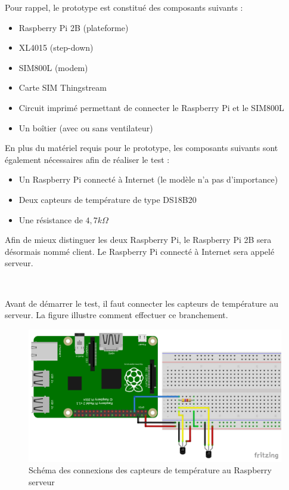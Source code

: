 Pour rappel, le prototype est constitué des composants suivants :

\begin{itemize}
  \item Raspberry Pi 2B (plateforme)
  \item XL4015 (step-down)
  \item SIM800L (modem)
  \item Carte SIM Thingstream
  \item Circuit imprimé permettant de connecter le Raspberry Pi et le SIM800L
  \item	Un boîtier (avec ou sans ventilateur)
\end{itemize}

\noindent
En plus du matériel requis pour le prototype, les composants suivants sont également nécessaires afin de réaliser le test :

\begin{itemize}
  \item Un Raspberry Pi connecté à Internet (le modèle n’a pas d’importance)
  \item Deux capteurs de température de type DS18B20
  \item Une résistance de $4,7 k\Omega$
\end{itemize}

\noindent
Afin de mieux distinguer les deux Raspberry Pi, le Raspberry Pi 2B sera désormais nommé client. Le Raspberry Pi connecté à Internet sera appelé serveur.

~

\noindent
Avant de démarrer le test, il faut connecter les capteurs de température au serveur. La figure illustre comment effectuer ce branchement.

\begin{figure}
  \includegraphics[width=\textwidth]{img/el_prototype/test_conn.png}
  \caption{Schéma des connexions des capteurs de température au Raspberry serveur}
  \label{fig:connnn}
\end{figure}

